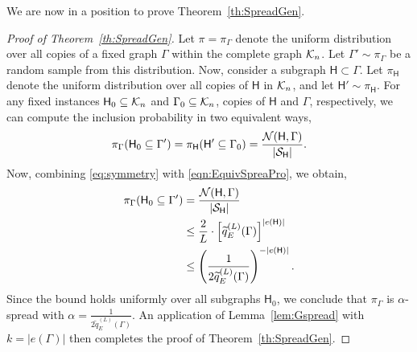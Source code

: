 \documentclass[12pt]{article}
\newcommand{\calK}{{\cal K}}
\newcommand{\calN}{{\cal N}}
\newcommand{\calS}{{\cal S}}
\newcommand{\pp}[1]{\left[#1\right]}
\newcommand{\s}[1]{\mathsf{#1}}
\begin{document}
We are now in a position to prove Theorem~\ref{th:SpreadGen}.
\begin{proof}[Proof of Theorem~\ref{th:SpreadGen}]
Let $\pi = \pi_\Gamma$ denote the uniform distribution over all copies of a fixed graph $\Gamma$ within the complete graph $\calK_n$. Let $\Gamma'\sim\pi_\Gamma$ be a random sample from this distribution. Now, consider a subgraph $\s{H}\subset\Gamma$. Let $ \pi_{\s{H}} $ denote the uniform distribution over all copies of $\s{H}$ in $\calK_n$, and let $\s{H}'\sim\pi_{\s{H}}$. For any fixed instances $ \s{H}_0 \subseteq \calK_n $ and $ \Gamma_0 \subseteq \calK_n $, copies of $ \s{H} $ and $ \Gamma $, respectively, we can compute the inclusion probability in two equivalent ways,
\begin{align}
\pi_{\Gamma}(\s{H}_0 \subseteq \Gamma') = \pi_{\s{H}}(\s{H}' \subseteq \Gamma_0) = \frac{\calN(\s{H},\Gamma)}{|\calS_{\s{H}}|}.
\label{eq:symmetry}
\end{align}
Now, combining \eqref{eq:symmetry} with \eqref{eqn:EquivSpreaPro}, we obtain,
\begin{align}
\pi_{\Gamma}(\s{H}_0 \subseteq \Gamma') &=\frac{\calN(\s{H},\Gamma)}{|\calS_{\s{H}}|} \\
&\leq  \frac{2}{L} \cdot \pp{\widetilde{q}^{(L)}_E(\Gamma)}^{|e(\s{H})|}\\
&\leq  \left( \frac{1}{2\widetilde{q}^{(L)}_E(\Gamma)} \right)^{-|e(\s{H})|}.
\end{align}
Since the bound holds uniformly over all subgraphs $\s{H}_0$, we conclude that $\pi_\Gamma$ is $\alpha$-spread with $\alpha = \frac{1}{2\widetilde{q}^{(L)}_E(\Gamma)}$. An application of Lemma~\ref{lem:Gspread} with $k = |e(\Gamma)|$ then completes the proof of Theorem~\ref{th:SpreadGen}.

\end{proof}
\end{document}
